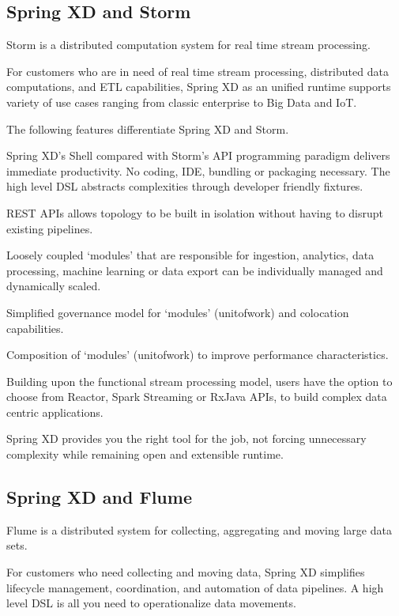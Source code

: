 \subsection{Spring XD and Storm}
Storm\cite{storm} is a distributed computation system for real time stream processing.

For customers who are in need of real time stream processing, distributed data computations, and ETL capabilities, Spring XD as an unified runtime supports variety of use cases ranging from classic enterprise to Big Data and IoT. 

The following features differentiate Spring XD and Storm.

\begin{itemize*}
\item Spring XD's Shell compared with Storm's API programming paradigm delivers immediate productivity. No coding, IDE, bundling or packaging necessary. The high level DSL abstracts complexities through developer friendly fixtures.
\item REST APIs allows topology to be built in isolation without having to disrupt existing pipelines.
\item Loosely coupled `modules' that are responsible for ingestion, analytics, data processing, machine learning or data export can be individually managed and dynamically scaled.
\item Simplified governance model for `modules' (unit\-of\-work) and colocation capabilities.
\item Composition of `modules' (unit\-of\-work) to improve performance characteristics. 
\item Building upon the functional stream processing model, users have the option to choose from Reactor\cite{reactor}, Spark Streaming or RxJava APIs, to build complex data centric applications.
\end{itemize*}

Spring XD provides you the right tool for the job, not forcing unnecessary complexity while remaining open and extensible runtime.

\subsection{Spring XD and Flume}
Flume\cite{flume} is a distributed system for collecting, aggregating and moving large data sets. 

For customers who need collecting and moving data, Spring XD simplifies lifecycle management, coordination, and automation of data pipelines. A high level DSL is all you need to operationalize data movements. 

